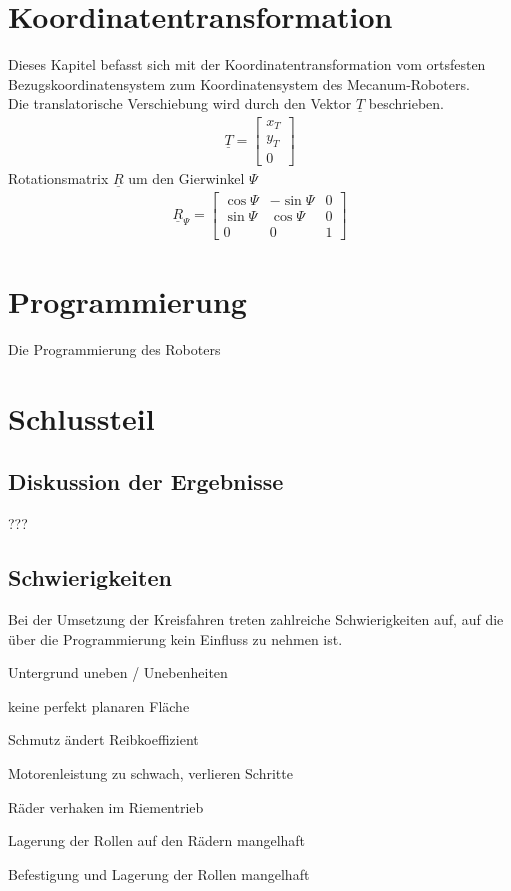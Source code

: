 \documentclass[a4paper]{article}
\begin{document}
\section{Koordinatentransformation}
Dieses Kapitel befasst sich mit der Koordinatentransformation vom ortsfesten Bezugskoordinatensystem zum Koordinatensystem des Mecanum-Roboters. \\
Die translatorische Verschiebung wird durch den Vektor $\underline T$ beschrieben.\\
\begin{align*}
\underline T = 
\begin{bmatrix}
x_{T}\\
y_{T}\\
0
\end{bmatrix}
\end{align*}
Rotationsmatrix $\underline R$ um den Gierwinkel $\Psi$\\
\begin{align*}
 \underline R_{\Psi} =
\begin{bmatrix}
  \cos{\Psi} & -\sin{\Psi} & 0\\
  \sin{\Psi} & \cos{\Psi} & 0\\
  0 & 0 & 1
\end{bmatrix}
\end{align*} 


\section{Programmierung}
Die Programmierung des Roboters


\section{Schlussteil}
\subsection{Diskussion der Ergebnisse}
???

\subsection{Schwierigkeiten}
Bei der Umsetzung der Kreisfahren treten zahlreiche Schwierigkeiten auf, auf die über die Programmierung kein Einfluss zu nehmen ist.
\begin{compactitem}
    \item Untergrund uneben / Unebenheiten
    \item keine perfekt planaren Fläche
    \item Schmutz ändert Reibkoeffizient
    \item Motorenleistung zu schwach, verlieren Schritte
    \item Räder verhaken im Riementrieb
    \item Lagerung der Rollen auf den Rädern mangelhaft
    \item Befestigung und Lagerung der Rollen mangelhaft
\end{compactitem}
\end{document}
